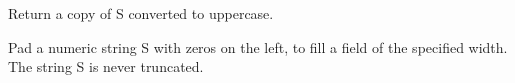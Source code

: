 \documentclass[letterpaper,10pt,english]{sphinxmanual}
\begin{document}
\begin{fulllineitems}

\begin{fulllineitems}
\label{api_reference:textblob_de.blob.Word.upper}
Return a copy of S converted to uppercase.

\end{fulllineitems}


\begin{fulllineitems}
\label{api_reference:textblob_de.blob.Word.zfill}
Pad a numeric string S with zeros on the left, to fill a field
of the specified width. The string S is never truncated.

\end{fulllineitems}


\end{fulllineitems}

\end{document}
